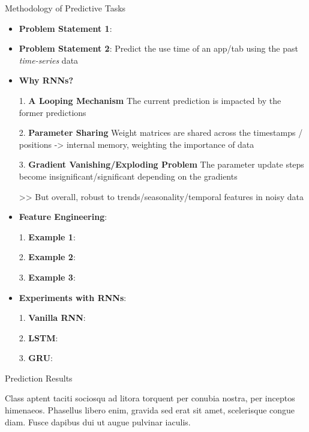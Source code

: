 \documentclass[final]{beamer}
\newlength{\colwidth}
\begin{document}
\begin{frame}[t]
\begin{columns}[t]
\begin{column}{\colwidth}
\begin{exampleblock}{Methodology of Predictive Tasks}

    \begin{itemize}
       \item \textbf{Problem Statement 1}:
       \item \textbf{Problem Statement 2}: Predict the use time of an app/tab using the past \textit{time-series} data
       \item \textbf{Why RNNs?}
       
       1. \textbf{A Looping Mechanism} The current prediction is impacted by the former predictions

       2. \textbf{Parameter Sharing} Weight matrices are shared across the timestamps / positions -> internal memory, weighting the importance of data
       
       3. \textbf{Gradient Vanishing/Exploding Problem} The parameter update steps become insignificant/significant depending on the gradients

       >> But overall, robust to trends/seasonality/temporal features in noisy data 

       \item \textbf{Feature Engineering}:
       
       1. \textbf{Example 1}:

       2. \textbf{Example 2}:
       
       3. \textbf{Example 3}:
       
       \item \textbf{Experiments with RNNs}:
       
       1. \textbf{Vanilla RNN}: 

       2. \textbf{LSTM}:
       
       3. \textbf{GRU}:




      \end{itemize}
    \end{exampleblock}

    \begin{block}{Prediction Results}

    Class aptent taciti sociosqu ad litora torquent per conubia nostra, per
    inceptos himenaeos. Phasellus libero enim, gravida sed erat sit amet,
    scelerisque congue diam. Fusce dapibus dui ut augue pulvinar iaculis.


\end{block}
\end{column}
\end{columns}
\end{frame}
\end{document}
